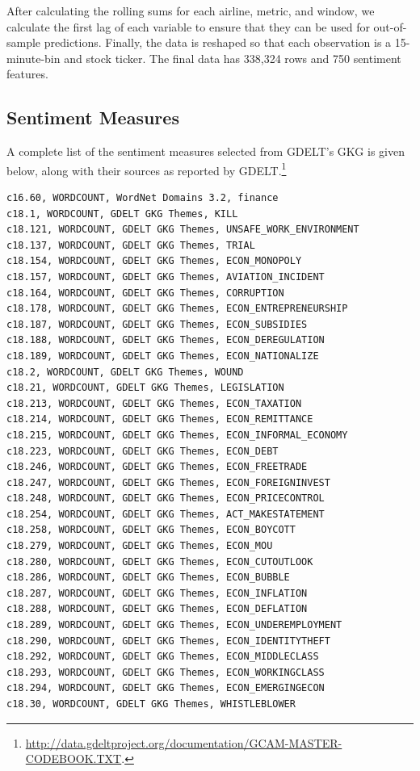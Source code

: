 \documentclass[12pt]{article}
\begin{document}
After calculating the rolling sums for each airline, metric, and window, we calculate the first lag of each variable to ensure that they can be used for out-of-sample predictions. Finally, the data is reshaped so that each observation is a 15-minute-bin and stock ticker. The final data has 338,324 rows and 750 sentiment features.

\subsection{Sentiment Measures}
A complete list of the sentiment measures selected from GDELT's GKG is given below, along with their sources as reported by GDELT.\footnote{\url{http://data.gdeltproject.org/documentation/GCAM-MASTER-CODEBOOK.TXT}.}

\footnotesize
\begin{verbatim}
c16.60, WORDCOUNT, WordNet Domains 3.2, finance
c18.1, WORDCOUNT, GDELT GKG Themes, KILL
c18.121, WORDCOUNT, GDELT GKG Themes, UNSAFE_WORK_ENVIRONMENT
c18.137, WORDCOUNT, GDELT GKG Themes, TRIAL
c18.154, WORDCOUNT, GDELT GKG Themes, ECON_MONOPOLY
c18.157, WORDCOUNT, GDELT GKG Themes, AVIATION_INCIDENT
c18.164, WORDCOUNT, GDELT GKG Themes, CORRUPTION
c18.178, WORDCOUNT, GDELT GKG Themes, ECON_ENTREPRENEURSHIP
c18.187, WORDCOUNT, GDELT GKG Themes, ECON_SUBSIDIES
c18.188, WORDCOUNT, GDELT GKG Themes, ECON_DEREGULATION
c18.189, WORDCOUNT, GDELT GKG Themes, ECON_NATIONALIZE
c18.2, WORDCOUNT, GDELT GKG Themes, WOUND
c18.21, WORDCOUNT, GDELT GKG Themes, LEGISLATION
c18.213, WORDCOUNT, GDELT GKG Themes, ECON_TAXATION
c18.214, WORDCOUNT, GDELT GKG Themes, ECON_REMITTANCE
c18.215, WORDCOUNT, GDELT GKG Themes, ECON_INFORMAL_ECONOMY
c18.223, WORDCOUNT, GDELT GKG Themes, ECON_DEBT
c18.246, WORDCOUNT, GDELT GKG Themes, ECON_FREETRADE
c18.247, WORDCOUNT, GDELT GKG Themes, ECON_FOREIGNINVEST
c18.248, WORDCOUNT, GDELT GKG Themes, ECON_PRICECONTROL
c18.254, WORDCOUNT, GDELT GKG Themes, ACT_MAKESTATEMENT
c18.258, WORDCOUNT, GDELT GKG Themes, ECON_BOYCOTT
c18.279, WORDCOUNT, GDELT GKG Themes, ECON_MOU
c18.280, WORDCOUNT, GDELT GKG Themes, ECON_CUTOUTLOOK
c18.286, WORDCOUNT, GDELT GKG Themes, ECON_BUBBLE
c18.287, WORDCOUNT, GDELT GKG Themes, ECON_INFLATION
c18.288, WORDCOUNT, GDELT GKG Themes, ECON_DEFLATION
c18.289, WORDCOUNT, GDELT GKG Themes, ECON_UNDEREMPLOYMENT
c18.290, WORDCOUNT, GDELT GKG Themes, ECON_IDENTITYTHEFT
c18.292, WORDCOUNT, GDELT GKG Themes, ECON_MIDDLECLASS
c18.293, WORDCOUNT, GDELT GKG Themes, ECON_WORKINGCLASS
c18.294, WORDCOUNT, GDELT GKG Themes, ECON_EMERGINGECON
c18.30, WORDCOUNT, GDELT GKG Themes, WHISTLEBLOWER

\end{verbatim}
\end{document}
